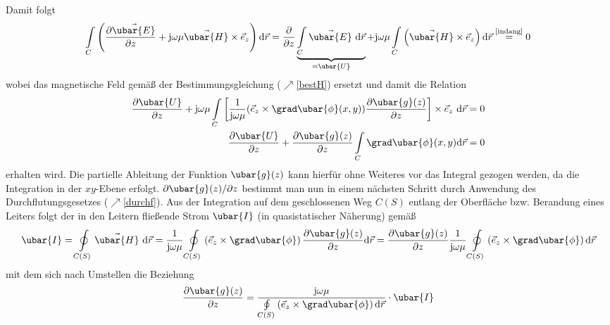 Damit folgt
\begin{equation}
	\int\limits_{C}\left(\frac{\partial \vec{\ubar{E}}}{\partial z}+\mathrm{j} \omega \mu \vec{\ubar{H}} \times \vec{e}_{z}\right) \mathrm{d} \vec{r}=\frac{\partial}{\partial z} \underbrace{\int\limits_{C} \vec{\ubar{E}} \mathrm{~d} \vec{r}}_{=\ubar{U}}+\mathrm{j} \omega \mu \int\limits_{C}\left(\vec{\ubar{H}} \times \vec{e}_{z}\right) \mathrm{d} \vec{r}\stackrel{\text{\ref{indang}}}{=}0 
\end{equation}
wobei das magnetische Feld gemäß der Bestimmungsgleichung ($\nearrow$\ref{bestH}) ersetzt und damit die Relation
\begin{equation}
\begin{split}
	\frac{\partial \ubar{U}}{\partial z}+\mathrm{j} \omega \mu \int\limits_{C}\left[\frac{1}{\mathrm{j} \omega \mu} (\vec{e}_{z} \times \grad \ubar{\phi}(x, y))  \frac{\partial \ubar{g}(z)}{\partial z}\right] \times \vec{e}_{z} \mathrm{~d} \vec{r}&=0 \\
	\frac{\partial \ubar{U}}{\partial z}+\frac{\partial \ubar{g}(z)}{\partial z} \int\limits_{C} \grad \ubar{\phi}(x, y) \mathrm{d} \vec{r}&=0 
\end{split}
\end{equation}
erhalten wird. Die partielle Ableitung der Funktion $\ubar{g}(z)$ kann hierfür ohne Weiteres vor das Integral gezogen werden, da die Integration in der $x y$-Ebene erfolgt. ${\partial \ubar{g}(z)}/{\partial z}$ bestimmt man nun in einem nächsten Schritt durch Anwendung des Durchflutungsgesetzes ($\nearrow$\ref{durchf}). Aus der Integration auf dem geschlossenen Weg $C(S)$ entlang der Oberfläche bzw. Berandung eines Leiters folgt der in den Leitern fließende Strom $\ubar{I}$ (in quasistatischer Näherung) gemäß
\begin{equation}\label{fliesstromLT}
	\ubar{I}=\oint\limits_{C(S)} \vec{\ubar{H}} \mathrm{~d} \vec{r}=\frac{1}{\mathrm{j} \omega \mu} \oint\limits_{C(S)}\left(\vec{e}_{z} \times \grad \ubar{\phi}\right) \frac{\partial \ubar{g}(z)}{\partial z} \mathrm{d} \vec{r}=\frac{\partial \ubar{g}(z)}{\partial z} \frac{1}{\mathrm{j} \omega \mu} \oint\limits_{C(S)}\left(\vec{e}_{z} \times \grad \ubar{\phi}\right) \mathrm{d} \vec{r} 
\end{equation}
mit dem sich nach Umstellen die Beziehung
\begin{equation}
	\frac{\partial \ubar{g}(z)}{\partial z}=\frac{\mathrm{j} \omega \mu}{\oint\limits_{C(S)}\left(\vec{e}_{z} \times \grad \ubar{\phi}\right) \mathrm{d} \vec{r}} \cdot \ubar{I} 
\end{equation}
